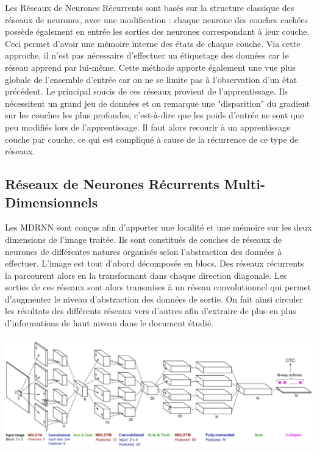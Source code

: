 Les Réseaux de Neurones Récurrents sont basés sur la structure classique des réseaux de neurones,
avec une modification : chaque neurone des couches cachées possède également en entrée les sorties
des neurones correspondant à leur couche. Ceci permet d'avoir une mémoire interne des états de chaque couche.
Via cette approche, il n'est pas nécessaire d'effectuer un étiquetage des données car le réseau apprend
par lui-même. Cette méthode apporte également une vue plus globale de l'ensemble d'entrée car on ne se limite
pas à l'observation d'un état précédent. Le principal soucis de ces réseaux provient de l'apprentissage.
Ils nécessitent un grand jeu de données et on remarque une "disparition" du gradient sur les couches les plus
profondes, c'est-à-dire que les poids d'entrée ne sont que peu modifiés lors de l'apprentissage. Il faut alors
recourir à un apprentissage couche par couche, ce qui est compliqué à cause de la récurrence de ce type de réseaux.

\subsection{Réseaux de Neurones Récurrents Multi-Dimensionnels}

Les MDRNN sont conçus afin d'apporter une localité et une mémoire sur les deux dimensions de l'image traitée.
Ils sont constitués de couches de réseaux de neurones de différentes natures organisés selon l'abstraction des
données à effectuer. L'image est tout d'abord décomposée en blocs. Des réseaux récurrents la parcourent alors
en la transformant dans chaque direction diagonale. Les sorties de ces réseaux sont alors transmises à un
réseau convolutionnel qui permet d'augmenter le niveau d'abstraction des données de sortie. On fait ainsi
circuler les résultats des différents réseaux vers d'autres afin d'extraire de plus en plus d'informations
de haut niveau dans le document étudié.

\paragraph{}
\begin{mdframed}[frametitle={Figure 10 : Schéma de structure d'un MDRNN}, innerbottommargin=10]
\begin{center}
\includegraphics[width=0.6\linewidth]{mdrnn.png}
\end{center}
\end{mdframed}


